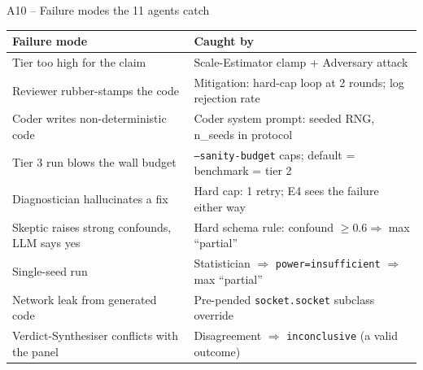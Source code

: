 \documentclass[10pt,aspectratio=169]{beamer}
\newcommand{\flag}[1]{\texttt{\small#1}}
\begin{document}
\begin{frame}{A10 -- Failure modes the 11 agents catch}
  \scriptsize
  \begin{table}\centering
    \begin{tabular}{@{}l l@{}}
      \toprule
      Failure mode                                  & Caught by \\
      \midrule
      Tier too high for the claim                   & Scale-Estimator clamp + Adversary attack \\
      Reviewer rubber-stamps the code               & Mitigation: hard-cap loop at 2 rounds; log rejection rate \\
      Coder writes non-deterministic code           & Coder system prompt: seeded RNG, n\_seeds in protocol \\
      Tier 3 run blows the wall budget              & \flag{--sanity-budget} caps; default = benchmark = tier 2 \\
      Diagnostician hallucinates a fix              & Hard cap: 1 retry; E4 sees the failure either way \\
      Skeptic raises strong confounds, LLM says yes & Hard schema rule: confound $\geq 0.6 \Rightarrow$ max ``partial'' \\
      Single-seed run                               & Statistician $\Rightarrow$ \texttt{power=insufficient} $\Rightarrow$ max ``partial'' \\
      Network leak from generated code              & Pre-pended \texttt{socket.socket} subclass override \\
      Verdict-Synthesiser conflicts with the panel  & Disagreement $\Rightarrow$ \texttt{inconclusive} (a valid outcome) \\
      \bottomrule
    \end{tabular}
  \end{table}
\end{frame}
\end{document}
